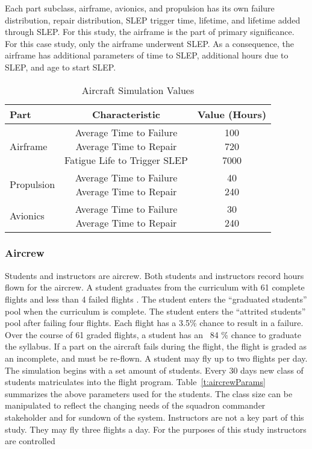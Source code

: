 \documentclass[preprint,12pt]{elsarticle}
\begin{document}
Each part subclass, airframe, avionics, and propulsion has its own
failure distribution, repair distribution, SLEP trigger time,
lifetime, and lifetime added through SLEP. For this study, the
airframe is the part of primary significance. For  this case study,
only the airframe underwent SLEP. As a consequence, the airframe has
additional parameters of time to SLEP, additional  hours due to SLEP,
and age to start SLEP.

\begin{table}[h]
  \centering
  \begin{tabular}{l c c}
    \hline
    \hline
    \textbf{Part} & \textbf{Characteristic} & \textbf{Value (Hours)} \\
    \hline
    Airframe & \makecell{ Average Time to Failure \\ Average Time to
      Repair \\ Fatigue Life to Trigger SLEP}  &
    \makecell{ 100 \\ 720 \\ 7000} \\
    \hline
    Propulsion & \makecell{ Average Time to Failure \\ Average Time to
      Repair}  &
    \makecell{ 40 \\ 240 \\ } \\
    \hline
    Avionics & \makecell{ Average Time to Failure \\ Average Time to
      Repair}  &
    \makecell{ 30 \\ 240 \\ } \\
    \hline
  \end{tabular}
  \caption{Aircraft Simulation Values}
  \label{t:PartSettings}
\end{table}



\subsubsection{Aircrew}

Students and instructors are aircrew. Both
students and instructors record hours flown for the aircrew.  A
student graduates from the curriculum with 61 complete flights and
less than 4 failed 
flights \cite{Air2009}. The student enters the ``graduated students''
pool when the curriculum is complete. The student enters the
``attrited students'' pool after failing four flights. Each flight has
a 3.5\% chance to result in a failure. Over the course of 61 graded
flights, a student has an ~84 \% chance to graduate the syllabus. If a
part on the aircraft fails during the flight, the 
flight is graded as an incomplete, and must be re-flown. A student may
fly up to two flights per day. The simulation begins with a set
amount of students. Every 30 days new class of students
matriculates into the flight program. Table~\ref{t:aircrewParams}
summarizes the above parameters used for the students. The class size
can be manipulated to reflect the changing needs of the squadron
commander stakeholder and for sundown of the system. Instructors are
not a key part of this study. They may fly three flights a
day. For the purposes of this study instructors are controlled
\end{document}

